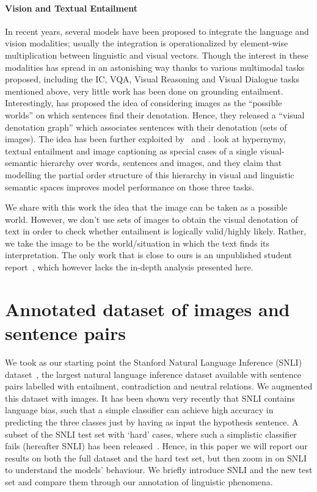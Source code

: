 \documentclass[11pt]{article}
\begin{document}
\paragraph{Vision and Textual Entailment}
In recent years, several models have been proposed to integrate the
language and vision modalities; usually the integration is
operationalized by element-wise
multiplication between linguistic and
visual vectors.
Though the interest in these modalities has spread in
an astonishing way thanks to various multimodal tasks proposed, including
 the IC, VQA, Visual Reasoning and Visual Dialogue tasks mentioned above,
very little work has been done on grounding entailment. Interestingly,
 has proposed the idea of considering images as
the ``possible worlds'' on which sentences find their
denotation. Hence, they released a ``visual denotation graph'' which
associates sentences with their denotation (sets of images). The idea 
has been further exploited by~ and .
 look at hypernymy, textual entailment and image
captioning as special cases of a single visual-semantic hierarchy over
words, sentences and images, and they claim that modelling the partial
order structure of this hierarchy in visual and linguistic semantic
spaces improves model performance on those three tasks.  

We share
with this work the idea that the image can be taken as a possible
world. However, we don't use sets of images to obtain the visual
denotation of text in order to check whether entailment is logically
valid/highly likely. Rather, we take the image to be the
world/situation in which the text finds its interpretation.
The only work that is close to ours is an unpublished student
report~\cite{sitz:mult16}, which however lacks the in-depth analysis presented
here.
 \section{Annotated dataset of images and sentence pairs}
\label{sec:dataset}

We took as our starting point the Stanford Natural Language Inference (SNLI)
dataset~\cite{snli:emnlp2015}, the largest natural language inference
dataset available with sentence pairs labelled with entailment, contradiction and neutral
relations. We augmented this dataset with images. It has
been shown very recently that SNLI contains language bias, such that a
simple classifier can achieve high accuracy in predicting the three
classes just by having as input the hypothesis sentence. A subset of
the SNLI test set with `hard' cases, where such a simplistic classifier fails (hereafter SNLI)
has
been released~\cite{guru:anno18}. Hence, in this paper we will report
our results on both the full dataset and the hard test set, but then zoom
in on SNLI
to understand the models' behaviour. We
briefly introduce SNLI and the new test set and compare
them through our annotation of linguistic phenomena.
\end{document}
